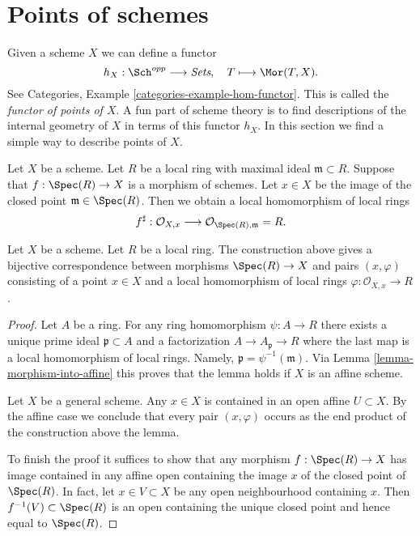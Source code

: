 \section{Points of schemes}
\label{section-points}

\noindent
Given a scheme $X$ we can define a functor
$$
h_X : \Sch^{opp}
\longrightarrow
\textit{Sets}, \quad
T \longmapsto \Mor(T, X).
$$
See Categories, Example \ref{categories-example-hom-functor}.
This is called the {\it functor of points of $X$}.
A fun part of scheme theory is to find descriptions of
the internal geometry of $X$ in terms of this functor $h_X$.
In this section we find a simple way to describe
points of $X$.

\medskip\noindent
Let $X$ be a scheme. Let $R$ be a local ring with maximal ideal
$\mathfrak m \subset R$. Suppose that $f : \Spec(R) \to X$
is a morphism of schemes. Let $x \in X$ be the image of the closed point
$\mathfrak m \in \Spec(R)$. Then we obtain a local homomorphism
of local rings
$$
f^\sharp :
\mathcal{O}_{X, x}
\longrightarrow
\mathcal{O}_{\Spec(R), \mathfrak m} = R.
$$

\begin{lemma}
\label{lemma-morphism-from-spec-local-ring}
Let $X$ be a scheme. Let $R$ be a local ring.
The construction above gives a bijective correspondence
between morphisms $\Spec(R) \to X$ and pairs
$(x, \varphi)$ consisting of a point $x \in X$ and
a local homomorphism of local rings $\varphi : \mathcal{O}_{X, x} \to R$.
\end{lemma}

\begin{proof}
Let $A$ be a ring. For any ring homomorphism $\psi : A \to R$
there exists a unique prime ideal $\mathfrak p \subset A$
and a factorization $A \to A_{\mathfrak p} \to R$ where the
last map is a local homomorphism of local rings. Namely,
$\mathfrak p = \psi^{-1}(\mathfrak m)$. Via
Lemma \ref{lemma-morphism-into-affine}
this proves that the lemma holds if $X$ is an affine scheme.

\medskip\noindent
Let $X$ be a general scheme. Any $x \in X$ is contained in
an open affine $U \subset X$. By the affine case we conclude that every pair
$(x, \varphi)$ occurs as the end product of the construction
above the lemma.

\medskip\noindent
To finish the proof it suffices to show that any morphism
$f : \Spec(R) \to X$ has image contained in any affine
open containing the image $x$ of the closed
point of $\Spec(R)$. In fact, let $x \in V \subset X$
be any open neighbourhood containing $x$. Then
$f^{-1}(V) \subset \Spec(R)$ is an open containing
the unique closed point and hence equal to $\Spec(R)$.
\end{proof}

